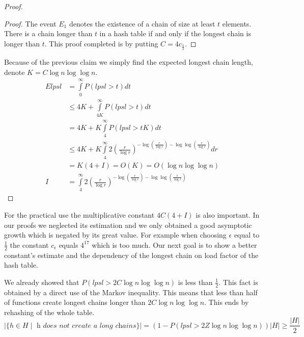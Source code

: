\begin{proof}
\begin{proof}
The event $E_1$ denotes the existence of a chain of size at least $t$ elements. There is a chain longer than $t$ in a hash table if and only if the longest chain is longer than $t$. This proof completed is by putting $C = 4c_{\frac{1}{2}}$.
\end{proof}

Because of the previous claim we simply find the expected longest chain length, denote $K = C\log n \log \log n$.
\begin{displaymath}
\begin{split}
E lpsl 
	& = \int\limits_0^{\infty} P(lpsl > t) dt \\
	& \leq 4K + \int\limits_{4K}^\infty P(lpsl > t) dt \\
	& = 4K + K \int\limits_4^\infty P(lpsl > tK) dt \\
	& \leq 4K + K \int\limits_4^\infty 2 \left(\frac{r}{\log r}\right)^{-\log \left(\frac{r}{\log r}\right) - \log \log \left(\frac{r}{\log r}\right)} dr \\
	& = K(4 + I) = O(K) = O(\log n \log \log n) \\
I 	& = \int\limits_4^\infty 2 \left(\frac{r}{\log r}\right)^{-\log \left(\frac{r}{\log r}\right) - \log \log \left(\frac{r}{\log r}\right)}
\end{split}
\end{displaymath}
\end{proof}

For the practical use the multiplicative constant $4C(4 + I)$ is also important. In our proofs we neglected its estimation and we only obtained a good asymptotic growth which is negated by its great value. For example when choosing $\epsilon$ equal to $\frac{1}{2}$ the constant $c_\epsilon$ equals $4 ^ 17$ which is too much. Our next goal is to show a better constant's estimate and the dependency of the longest chain on load factor of the hash table.

We already showed that $P(lpsl > 2C \log n \log \log n)$ is less than $\frac{1}{2}$. This fact is obtained by a direct use of the Markov inequality. This means that less than half of functions create longest chains longer than $2C \log n \log \log n$. This ends by rehashing of the whole table.
\begin{displaymath}
|\lbrace h \in H \mid \textit{ h does not create a long chains} \rbrace| = \left(1 - P(lpsl > 2Z \log n \log \log n)\right) |H| \geq \frac{|H|}{2}
\end{displaymath}

